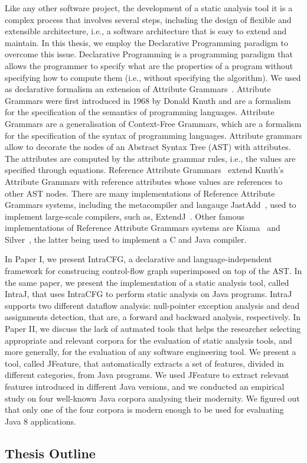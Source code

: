 Like any other software project, the development of a static analysis tool
it is a complex process that involves several steps, including the design of 
flexible and extensible architecture, i.e., a software architecture that is 
easy to extend and maintain. In this thesis, we employ the Declarative Programming
paradigm to overcome this issue. Declarative Programming is a programming 
paradigm that allows the programmer to specify what are the properties of a
program without specifying how to compute them (i.e., without specifying the 
algorithm). We used as declarative formalism an extension of Attribute Grammars~\cite{knuth1968semantics}. Attribute Grammars
were first introduced in 1968 by Donald Knuth and are a formalism for the specification
of the semantics of programming languages. Attribute Grammars are a generalisation
of Context-Free Grammars, which are a formalism for the specification of the syntax
of programming languages. 
Attribute grammars allow to decorate the nodes of an Abstract Syntax Tree (AST) with attributes. 
The attributes are computed by the attribute grammar rules, i.e., the values are specified
through equations. Reference Attribute Grammars~\cite{hedin2000rags} extend Knuth's Attribute Grammars
with reference attributes whose values are references to other AST nodes. 
There are many implementations of Reference Attribute Grammars systems, including
the metacompiler and langauge JastAdd~\cite{ekman2007jastadd}, used to implement large-scale compilers, such as,
ExtendJ~\cite{DBLP:conf/oopsla/EkmanH07}.
Other famous implementations of Reference Attribute Grammars systems are Kiama~\cite{SLOANE2010205} and Silver~\cite{VANWYK201039}, 
the latter being used to implement a C and Java compiler.


In Paper I, we present IntraCFG, a declarative and language-independent framework for 
construcing control-flow graph superimposed on top of the AST. In the same paper, we
present the implementation of a static analysis tool, called IntraJ, that uses IntraCFG
to perform static analysis on Java programs. IntraJ supports two different dataflow analysis:
null-pointer exception analysis and dead assignments detection, that are, a forward and 
backward analysis, respectively. 
In Paper II, we discuss the lack of autmated tools that helps the researcher 
selecting appropriate and relevant corpora for the evaluation of static analysis tools, and more
generally, for the evaluation of any software engineering tool. We present a tool, called
JFeature, that automatically extracts a set of features, divided in different categories,
from Java programs. We used JFeature to extract relevant features introduced in different 
Java versions, and we conducted an empirical study on four well-known Java corpora analysing 
their modernity. We figured out that only one of the four corpora is modern enough to be used
for evaluating Java 8 applications.

 \subsection{Thesis Outline}








